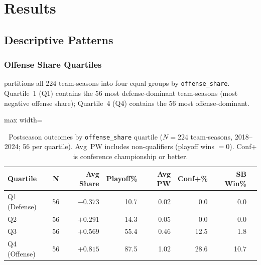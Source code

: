 \documentclass[12pt,a4paper]{article}
\begin{document}
\section{Results}
\label{sec:results}

\subsection{Descriptive Patterns}
\label{sec:descriptive}

\subsubsection{Offense Share Quartiles}

 partitions all 224 team-seasons into four equal groups by \texttt{offense\_share}. Quartile~1 (Q1) contains the 56 most defense-dominant team-seasons (most negative offense share); Quartile~4 (Q4) contains the 56 most offense-dominant.

\begin{table}[htbp]
  \centering
  \caption{Postseason outcomes by \texttt{offense\_share} quartile ($N = 224$
           team-seasons, 2018--2024; 56 per quartile). Avg~PW includes
           non-qualifiers (playoff wins $= 0$). Conf+ is conference
           championship or better.}
  \label{tab:quartile}
  \begin{adjustbox}{max width=\textwidth}
  \begin{tabular}{lcrrrrrr}
    \toprule
    \textbf{Quartile} & \textbf{N}
      & \textbf{Avg Share} & \textbf{Playoff\%}
      & \textbf{Avg PW} & \textbf{Conf+\%} & \textbf{SB Win\%} \\
    \midrule
    Q1 (Defense) & 56 & $-0.373$ & 10.7           & 0.02 & \phantom{0}0.0 & 0.0 \\
    Q2           & 56 & $+0.291$ & 14.3           & 0.05 & \phantom{0}0.0 & 0.0 \\
    Q3           & 56 & $+0.569$ & 55.4           & 0.46 & 12.5           & 1.8 \\
    Q4 (Offense) & 56 & $+0.815$ & 87.5           & 1.02 & 28.6           & 10.7 \\
    \bottomrule
  \end{tabular}
  \end{adjustbox}
\end{table}
\end{document}
